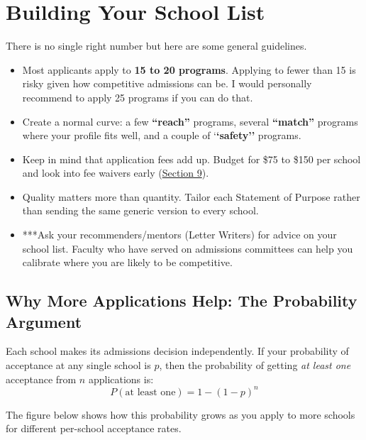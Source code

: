 \documentclass[11pt, letterpaper]{article}
\begin{document}
\newpage
\section{Building Your School List}\label{sec:schoollist}

There is no single right number but here are some general guidelines.

\begin{itemize}[leftmargin=*, itemsep=2pt]
    \item Most applicants apply to \textbf{15 to 20 programs}. Applying to fewer than 15 is risky given how competitive admissions can be. I would personally recommend to apply 25 programs if you can do that.
    \item Create a normal curve: a few \textbf{``reach''} programs, several \textbf{``match''} programs where your profile fits well, and a couple of `\textbf{`safety''} programs.
    \item Keep in mind that application fees add up. Budget for \$75 to \$150 per school and look into fee waivers early (\hyperref[sec:fees]{Section 9}). 
    \item Quality matters more than quantity. Tailor each Statement of Purpose rather than sending the same generic version to every school.
    \item ***Ask your recommenders/mentors (Letter Writers) for advice on your school list. Faculty who have served on admissions committees can help you calibrate where you are likely to be competitive.
\end{itemize}

\subsection{Why More Applications Help: The Probability Argument}

Each school makes its admissions decision independently. If your probability of acceptance at any single school is $p$, then the probability of getting \textit{at least one} acceptance from $n$ applications is:
$$P(\text{at least one}) = 1 - (1 - p)^{n}$$

The figure below shows how this probability grows as you apply to more schools for different per-school acceptance rates.
\end{document}
